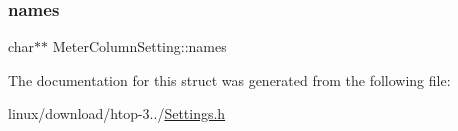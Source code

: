 \mbox{\label{structMeterColumnSetting_a30d70e0584a13084bbf9f1211c1e65d0}} 
\subsubsection{\texorpdfstring{names}{names}}
{\footnotesize\ttfamily char$\ast$$\ast$ Meter\+Column\+Setting\+::names}



The documentation for this struct was generated from the following file\+:\begin{DoxyCompactItemize}
\item 
linux/download/htop-\/3../\hyperlink{Settings_8h}{Settings.\+h}\end{DoxyCompactItemize}
